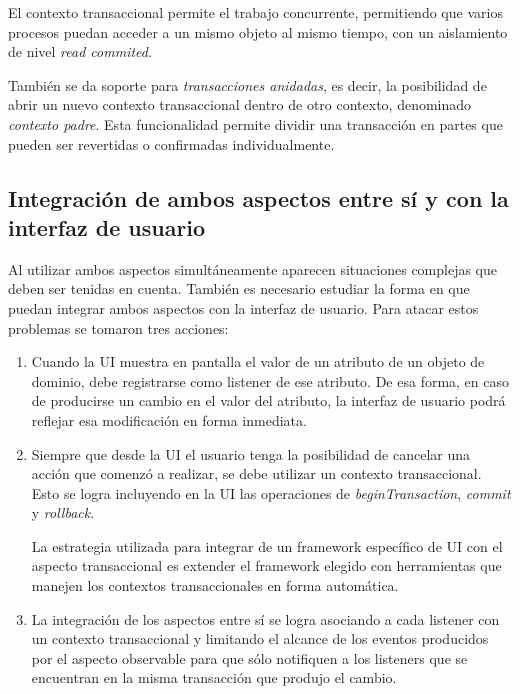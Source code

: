 		El contexto transaccional permite el trabajo concurrente, permitiendo que
		varios procesos puedan acceder a un mismo objeto al mismo
		tiempo, con un aislamiento de nivel \emph{read commited}.
		 
		También se da soporte para \emph{transacciones anidadas}, es decir, la
		posibilidad de abrir un nuevo contexto transaccional dentro de otro contexto,
		denominado \emph{contexto padre}.
		Esta funcionalidad permite dividir una transacción en partes que pueden ser
		revertidas o confirmadas individualmente.
		
	\subsection{Integración de ambos aspectos entre sí y con la interfaz de usuario}
	\label{sec:Union}
		Al utilizar ambos aspectos simultáneamente aparecen situaciones complejas que
		deben ser tenidas en cuenta. También es necesario estudiar la forma en que
		puedan integrar ambos aspectos con la interfaz de usuario.
		Para atacar estos problemas se tomaron tres acciones:
		
		\begin{enumerate}
		  \item Cuando la UI muestra en pantalla el valor de un
		  atributo de un objeto de dominio, debe registrarse como listener de ese
		  atributo.
		  De esa forma, en caso de producirse un cambio en el valor del atributo, la
		  interfaz de usuario podrá reflejar esa modificación en forma inmediata.
		  
		  \item Siempre que desde la UI el usuario tenga la posibilidad de cancelar
		  una acción que comenzó a realizar, se debe utilizar un contexto
		  transaccional.
		  Esto se logra incluyendo en la UI las operaciones de
		  \emph{beginTransaction}, \emph{commit} y \emph{rollback}.
		  
		  La estrategia utilizada para integrar de un framework
		  específico de UI con el aspecto transaccional es extender el framework
		  elegido con herramientas que manejen los contextos transaccionales en forma
		  automática.
		  
		  \item La integración de los aspectos entre sí se logra asociando a
		  cada listener con un contexto transaccional y limitando el alcance de los
		  eventos producidos por el aspecto observable para que sólo notifiquen a los
		  listeners que se encuentran en la misma transacción que produjo el cambio.
		\end{enumerate}
